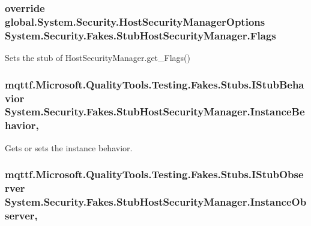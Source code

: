 \hypertarget{class_system_1_1_security_1_1_fakes_1_1_stub_host_security_manager_a1de097aee42b9b228654efed758bc459}{
\subsubsection[{Flags}]{\setlength{\rightskip}{0pt plus 5cm}override global.\-System.\-Security.\-Host\-Security\-Manager\-Options System.\-Security.\-Fakes.\-Stub\-Host\-Security\-Manager.\-Flags\hspace{0.3cm}{\ttfamily [get]}}}\label{class_system_1_1_security_1_1_fakes_1_1_stub_host_security_manager_a1de097aee42b9b228654efed758bc459}


Sets the stub of Host\-Security\-Manager.\-get\-\_\-\-Flags()

\hypertarget{class_system_1_1_security_1_1_fakes_1_1_stub_host_security_manager_aca1358a3fdc6bcbaac93e4b5616a0cfe}{
\subsubsection[{Instance\-Behavior}]{\setlength{\rightskip}{0pt plus 5cm}mqttf.\-Microsoft.\-Quality\-Tools.\-Testing.\-Fakes.\-Stubs.\-I\-Stub\-Behavior System.\-Security.\-Fakes.\-Stub\-Host\-Security\-Manager.\-Instance\-Behavior\hspace{0.3cm}{\ttfamily [get]}, {\ttfamily [set]}}}\label{class_system_1_1_security_1_1_fakes_1_1_stub_host_security_manager_aca1358a3fdc6bcbaac93e4b5616a0cfe}


Gets or sets the instance behavior.

\hypertarget{class_system_1_1_security_1_1_fakes_1_1_stub_host_security_manager_a2d4010cc76435c6f54da67d1a8be3dbc}{
\subsubsection[{Instance\-Observer}]{\setlength{\rightskip}{0pt plus 5cm}mqttf.\-Microsoft.\-Quality\-Tools.\-Testing.\-Fakes.\-Stubs.\-I\-Stub\-Observer System.\-Security.\-Fakes.\-Stub\-Host\-Security\-Manager.\-Instance\-Observer\hspace{0.3cm}{\ttfamily [get]}, {\ttfamily [set]}}}\label{class_system_1_1_security_1_1_fakes_1_1_stub_host_security_manager_a2d4010cc76435c6f54da67d1a8be3dbc}


